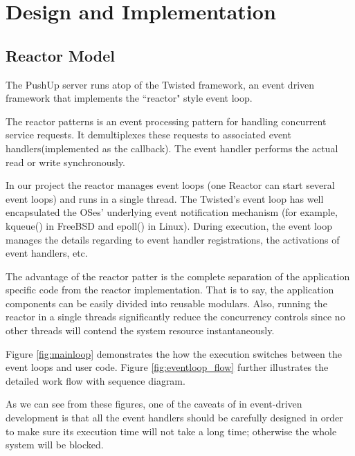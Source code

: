 \section {Design and Implementation\\}

\subsection{Reactor Model\\}
The PushUp server runs atop of the Twisted framework\cite{Twisted}, an 
event driven framework that implements the ``reactor" style event loop.

The reactor patterns is an event processing pattern for handling concurrent
service requests. It demultiplexes these requests to associated event
handlers(implemented as the callback). The event handler performs
the actual read or write synchronously.

In our project the reactor manages event loops (one Reactor 
can start several event loops) and runs in a single thread. The
Twisted's event loop has well encapsulated the OSes' underlying 
event notification mechanism (for example, kqueue() in FreeBSD 
and epoll() in Linux).
During execution, the event loop manages the details regarding to
event handler registrations, the activations of event handlers, etc.

The advantage of the reactor patter is the complete separation of the 
application specific code from the reactor implementation. That is to
say, the application components can be easily divided into reusable 
modulars. Also, running the reactor in a single threads significantly
reduce the concurrency controls since no other threads will contend 
the system resource instantaneously.

Figure \ref{fig:mainloop} demonstrates the how the execution switches
between the event loops and user code. Figure \ref{fig:eventloop_flow} 
further illustrates the detailed work flow with sequence diagram.

As we can see from these figures, one of the caveats of in 
event-driven development is that all the event handlers should 
be carefully designed in order to make sure its execution time 
will not take a long time; otherwise the whole system will 
be blocked.

